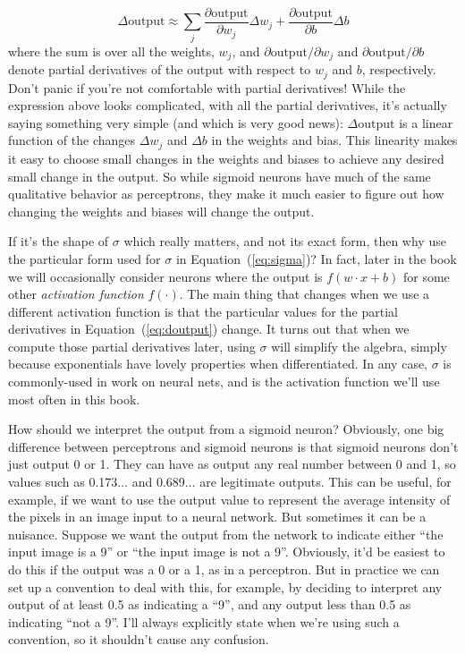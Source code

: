 \documentclass[a4paper,twoside,10pt]{book}
\begin{document}
\begin{equation}
\Delta\textrm{output}\approx \sum_j\frac{\partial\textrm{output}}{\partial w_j}\Delta w_j + \frac{\partial\textrm{output}}{\partial b}\Delta b \tag{5}\label{eq:doutput}
\end{equation}		
where the sum is over all the weights, $w_j$, and $\partial\textrm{output}/\partial w_j$ and $\partial\textrm{output}/\partial b$ denote partial derivatives of the output with respect to $w_j$ and $b$, respectively. Don't panic if you're not comfortable with partial derivatives! While the expression above looks complicated, with all the partial derivatives, it's actually saying something very simple (and which is very good news): $\Delta\textrm{output}$ is a linear function of the changes $\Delta w_j$ and $\Delta b$ in the weights and bias. This linearity makes it easy to choose small changes in the weights and biases to achieve any desired small change in the output. So while sigmoid neurons have much of the same qualitative behavior as perceptrons, they make it much easier to figure out how changing the weights and biases will change the output.

If it's the shape of $\sigma$ which really matters, and not its exact form, then why use the particular form used for $\sigma$ in Equation~(\ref{eq:sigma})? In fact, later in the book we will occasionally consider neurons where the output is $f(w\cdot x + b)$ for some other \textit{activation function} $f(\cdot)$. The main thing that changes when we use a different activation function is that the particular values for the partial derivatives in Equation~(\ref{eq:doutput}) change. It turns out that when we compute those partial derivatives later, using $\sigma$ will simplify the algebra, simply because exponentials have lovely properties when differentiated. In any case, $\sigma$ is commonly-used in work on neural nets, and is the activation function we'll use most often in this book.

How should we interpret the output from a sigmoid neuron? Obviously, one big difference between perceptrons and sigmoid neurons is that sigmoid neurons don't just output 0 or 1. They can have as output any real number between 0 and 1, so values such as 0.173$\ldots$ and 0.689$\ldots$ are legitimate outputs. This can be useful, for example, if we want to use the output value to represent the average intensity of the pixels in an image input to a neural network. But sometimes it can be a nuisance. Suppose we want the output from the network to indicate either ``the input image is a 9'' or ``the input image is not a 9''. Obviously, it'd be easiest to do this if the output was a 0 or a 1, as in a perceptron. But in practice we can set up a convention to deal with this, for example, by deciding to interpret any output of at least 0.5 as indicating a ``9'', and any output less than 0.5 as indicating ``not a 9''. I'll always explicitly state when we're using such a convention, so it shouldn't cause any confusion.
\end{document}
